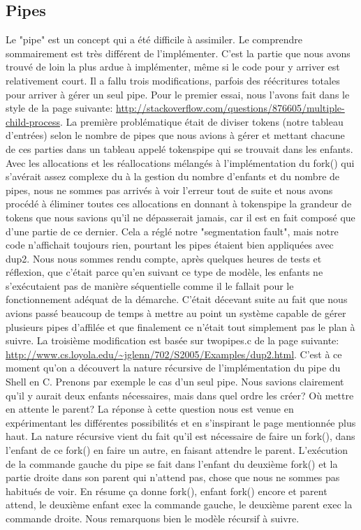 \documentclass{article}
\begin{document}
\subsection{Pipes}
Le "pipe" est un concept qui a été difficile à assimiler. Le comprendre sommairement est très différent de l’implémenter. C’est la partie que nous avons trouvé de loin la plus ardue à implémenter, même si le code pour y arriver est relativement court. Il a fallu trois modifications, parfois des réécritures totales pour arriver à gérer un seul pipe. Pour le premier essai, nous l’avons fait dans le style de la page suivante: \url{http://stackoverflow.com/questions/876605/multiple-child-process}. La première problématique était de diviser tokens (notre tableau d’entrées) selon le nombre de pipes que nous avions à gérer et mettant chacune de ces parties dans un tableau appelé tokenspipe qui se trouvait dans les enfants. Avec les allocations et les réallocations mélangés à l’implémentation du fork() qui s’avérait assez complexe du à la gestion du nombre d’enfants et du nombre de pipes, nous ne sommes pas arrivés à voir l’erreur tout de suite et nous avons procédé à éliminer toutes ces allocations en donnant à tokenspipe la grandeur de tokens que nous savions qu’il ne dépasserait jamais, car il est en fait composé que d’une partie de ce dernier. Cela a réglé notre "segmentation fault", mais notre code n’affichait toujours rien, pourtant les pipes étaient bien appliquées avec dup2. Nous nous sommes rendu compte, après quelques heures de tests et réflexion, que c’était parce qu’en suivant ce type de modèle, les enfants ne s’exécutaient pas de manière séquentielle comme il le fallait pour le fonctionnement adéquat de la démarche. C’était décevant suite au fait que nous avions passé beaucoup de temps à mettre au point un système capable de gérer plusieurs pipes d’affilée et que finalement ce n’était tout simplement pas le plan à suivre. La troisième modification est basée sur twopipes.c de la page suivante: \url{http://www.cs.loyola.edu/~jglenn/702/S2005/Examples/dup2.html}. C’est à ce moment qu’on a découvert la nature récursive de l’implémentation du pipe du Shell en C. Prenons par exemple le cas d’un seul pipe. Nous savions clairement qu’il y aurait deux enfants nécessaires, mais dans quel ordre les créer? Où mettre en attente le parent? La réponse à cette question nous est venue en expérimentant les différentes possibilités et en s’inspirant le page mentionnée plus haut. La nature récursive vient du fait qu’il est nécessaire de faire un fork(), dans l’enfant de ce fork() en faire un autre, en faisant attendre le parent. L’exécution de la commande gauche du pipe se fait dans l’enfant du deuxième fork() et la partie droite dans son parent qui n’attend pas, chose que nous ne sommes pas habitués de voir. En résume ça donne fork(), enfant fork() encore et parent attend, le deuxième enfant exec la commande gauche, le deuxième parent exec la commande droite. Nous remarquons bien le modèle récursif à suivre.
\end{document}
